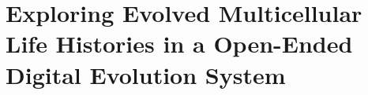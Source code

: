 \chapter{Exploring Evolved Multicellular Life Histories in a Open-Ended Digital Evolution System}
\label{ch:case-studies}

